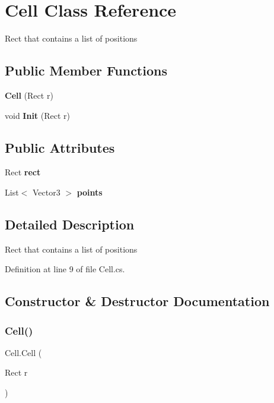 \section{Cell Class Reference}
\label{class_cell}


Rect that contains a list of positions  


\subsection*{Public Member Functions}
\begin{DoxyCompactItemize}
\item 
\textbf{ Cell} (Rect r)
\item 
void \textbf{ Init} (Rect r)
\end{DoxyCompactItemize}
\subsection*{Public Attributes}
\begin{DoxyCompactItemize}
\item 
Rect \textbf{ rect}
\item 
List$<$ Vector3 $>$ \textbf{ points}
\end{DoxyCompactItemize}


\subsection{Detailed Description}
Rect that contains a list of positions 



Definition at line 9 of file Cell.\+cs.



\subsection{Constructor \& Destructor Documentation}
\mbox{\label{class_cell_a31a37a3ea178fc1d06b42f512229ceee}} 
\subsubsection{Cell()}
{\footnotesize\ttfamily Cell.\+Cell (\begin{DoxyParamCaption}\item[{Rect}]{r }\end{DoxyParamCaption})}



